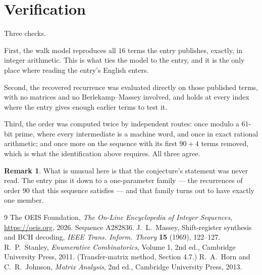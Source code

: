 \documentclass[11pt,a4paper]{article}
\theoremstyle{plain}
\theoremstyle{definition}
\newtheorem{remark}[theorem]{Remark}
\begin{document}
\section{Verification}

Three checks.

First, the walk model reproduces all $16$ terms the entry publishes, exactly, in integer
arithmetic. This is what ties the model to the entry, and it is the only place where reading
the entry's English enters.

Second, the recovered recurrence was evaluated directly on those published terms, with no
matrices and no Berlekamp--Massey involved, and holds at every index where the entry gives
enough earlier terms to test it.

Third, the order was computed twice by independent routes: once modulo a $61$-bit prime, where
every intermediate is a machine word, and once in exact rational arithmetic; and once more on
the sequence with its first $90+4$ terms removed, which is what the identification above
requires. All three agree.

\begin{remark}
What is unusual here is that the conjecture's statement was never read. The entry pins it down
to a one-parameter family --- the recurrences of order $90$ that this sequence satisfies
--- and that family turns out to have exactly one member.
\end{remark}

\begin{thebibliography}{9}
 The OEIS Foundation, \emph{The On-Line Encyclopedia of Integer
Sequences}, \url{https://oeis.org}, 2026. Sequence A282836.
 J.~L.~Massey, Shift-register synthesis and BCH decoding, \emph{IEEE
Trans. Inform. Theory} \textbf{15} (1969), 122--127.
 R.~P.~Stanley, \emph{Enumerative Combinatorics}, Volume 1, 2nd ed.,
Cambridge University Press, 2011. (Transfer-matrix method, Section 4.7.)
 R.~A.~Horn and C.~R.~Johnson, \emph{Matrix Analysis}, 2nd ed., Cambridge
University Press, 2013.
\end{thebibliography}
\end{document}
